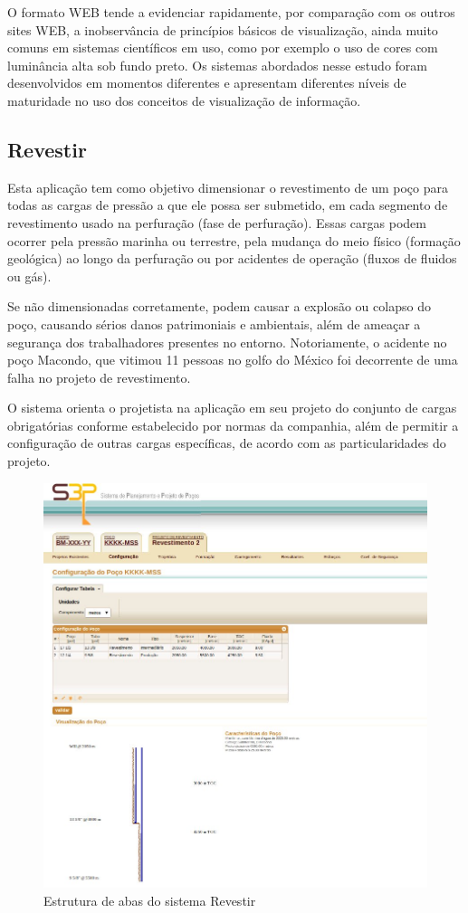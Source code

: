 \documentclass[]{article}
\begin{document}
O formato WEB tende a evidenciar rapidamente, por comparação com os outros sites WEB, a inobservância de princípios básicos de visualização, ainda muito comuns em sistemas científicos em uso, como por exemplo o uso de cores com luminância alta sob fundo preto.
Os sistemas abordados nesse estudo foram desenvolvidos em momentos diferentes e apresentam diferentes níveis de maturidade no uso dos conceitos de visualização de informação.


\subsection{Revestir}

Esta aplicação tem como objetivo dimensionar o revestimento de um poço para todas as cargas de pressão a que ele possa ser submetido, em cada segmento de revestimento usado na perfuração (fase de perfuração). Essas cargas podem ocorrer pela pressão marinha ou terrestre, pela mudança do meio físico (formação geológica) ao longo da perfuração ou por acidentes de operação (fluxos de fluidos ou gás).

Se não dimensionadas corretamente, podem causar a explosão ou colapso do poço, causando sérios danos patrimoniais e ambientais, além de ameaçar a segurança dos trabalhadores presentes no entorno. Notoriamente, o acidente no poço Macondo, que vitimou 11 pessoas no golfo do México foi decorrente de uma falha no projeto de revestimento. \cite{Brown:2010:Online}

O sistema orienta o projetista na aplicação em seu projeto do conjunto de cargas obrigatórias conforme estabelecido por normas da companhia, além de permitir a configuração de outras cargas específicas, de acordo com as particularidades do projeto.

\begin{figure}[!ht]
\centering
\includegraphics[scale=.5]{./s3p}
\caption{Estrutura de abas do sistema Revestir}
\label{fig:s3p}
\end{figure}
\end{document}
